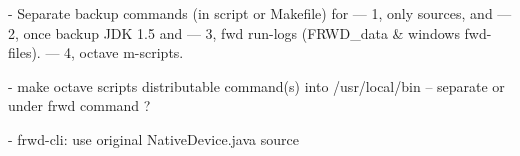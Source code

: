 
- Separate backup commands (in script or Makefile) for 
--- 1, only sources, and 
--- 2, once backup JDK 1.5 and 
--- 3, fwd run-logs (FRWD_data & windows fwd-files).
--- 4, octave m-scripts.

- make octave scripts distributable command(s) into /usr/local/bin
-- separate or under frwd command ?

- frwd-cli: use original NativeDevice.java source


